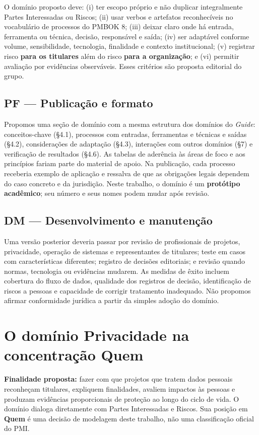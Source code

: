 \documentclass[11pt,a4paper]{article}
\begin{document}
O domínio proposto deve: (i) ter escopo próprio e não duplicar integralmente Partes Interessadas ou Riscos; (ii) usar verbos e artefatos reconhecíveis no vocabulário de processos do PMBOK 8; (iii) deixar claro onde há entrada, ferramenta ou técnica, decisão, responsável e saída; (iv) ser adaptável conforme volume, sensibilidade, tecnologia, finalidade e contexto institucional; (v) registrar risco \textbf{para os titulares} além do risco \textbf{para a organização}; e (vi) permitir avaliação por evidências observáveis. Esses critérios são proposta editorial do grupo.
\subsection{PF — Publicação e formato}

Propomos uma seção de domínio com a mesma estrutura dos domínios do \textit{Guide}: conceitos-chave (§4.1), processos com entradas, ferramentas e técnicas e saídas (§4.2), considerações de adaptação (§4.3), interações com outros domínios (§7) e verificação de resultados (§4.6). As tabelas de aderência às áreas de foco e aos princípios fariam parte do material de apoio. Na publicação, cada processo receberia exemplo de aplicação e ressalva de que as obrigações legais dependem do caso concreto e da jurisdição. Neste trabalho, o domínio é um \textbf{protótipo acadêmico}; seu número e seus nomes podem mudar após revisão.
\subsection{DM — Desenvolvimento e manutenção}

Uma versão posterior deveria passar por revisão de profissionais de projetos, privacidade, operação de sistemas e representantes de titulares; teste em casos com características diferentes; registro de decisões editoriais; e revisão quando normas, tecnologia ou evidências mudarem. As medidas de êxito incluem cobertura do fluxo de dados, qualidade dos registros de decisão, identificação de riscos a pessoas e capacidade de corrigir tratamento inadequado. Não propomos afirmar conformidade jurídica a partir da simples adoção do domínio.

\section{O domínio Privacidade na concentração Quem}

\textbf{Finalidade proposta:} fazer com que projetos que tratem dados pessoais reconheçam titulares, expliquem finalidades, avaliem impactos às pessoas e produzam evidências proporcionais de proteção ao longo do ciclo de vida. O domínio dialoga diretamente com Partes Interessadas e Riscos. Sua posição em \textbf{Quem} é uma decisão de modelagem deste trabalho, não uma classificação oficial do PMI.
\end{document}
